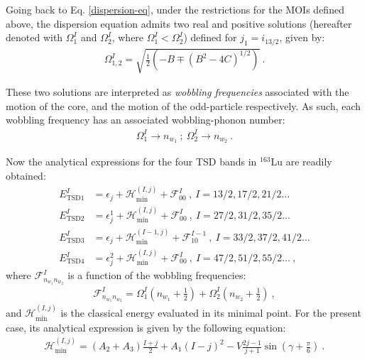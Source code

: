 \documentclass[myclassdoc,debug]{rjparticle}
\begin{document}
Going back to Eq. \ref{dispersion-eq}, under the restrictions for the MOIs defined above, the dispersion equation admits two real and positive solutions (hereafter denoted with $\Omega_1^I$ and $\Omega_2^I$, where $\Omega_1^I<\Omega_2^I$) defined for $j_1=i_{13/2}$, given by:
\begin{align}
    \Omega_{1,2}^I=\sqrt{\frac{1}{2}\left(-B\mp(B^2-4C)^{1/2}\right)}\ .
    \label{wobbling-frequencies}
\end{align}

These two solutions are interpreted as \emph{wobbling frequencies} associated with the motion of the core, and the motion of the odd-particle respectively. As such, each wobbling frequency has an associated wobbling-phonon number:
\begin{align}
    \Omega_1^I \to n_{w_1}\ ;\ \Omega_2^I \to n_{w_2}\ .
\end{align}


Now  the analytical expressions for the four TSD bands in $^{163}$Lu are readily obtained:
\begin{align}
    E_\text{TSD1}^I&=\epsilon_j+\mathcal{H}_\text{min}^{(I,j)}+\mathcal{F}_{00}^I\ ,\ I=13/2,17/2,21/2\dots \nonumber \\
    E_\text{TSD2}^I&=\epsilon_j^1+\mathcal{H}_\text{min}^{(I,j)}+\mathcal{F}_{00}^I\ ,\ I=27/2,31/2,35/2\dots \nonumber \\
    E_\text{TSD3}^I&=\epsilon_j+\mathcal{H}_\text{min}^{(I-1,j)}+\mathcal{F}_{10}^{I-1}\ ,\ I=33/2,37/2,41/2\dots \nonumber \\
    E_\text{TSD4}^I&=\epsilon_j^2+\mathcal{H}_\text{min}^{(I,j)}+\mathcal{F}_{00}^I\ ,\ I=47/2,51/2,55/2\dots\ ,
    \label{wobbling_energies}
\end{align}
where $\mathcal{F}_{n_{w_1}n_{w_2}}^I$ is a function of the wobbling frequencies:
\begin{align}
    \mathcal{F}_{n_{w_1}n_{w_2}}^I=\Omega_1^I\left(n_{w_1}+\frac{1}{2}\right)+\Omega_2^I\left(n_{w_2}+\frac{1}{2}\right)\ ,
    \label{f-term}
\end{align}
and $\mathcal{H}_\text{min}^{(I,j)}$ is the classical energy evaluated in its minimal point. For the present case, its analytical expression is given by the following equation:
\begin{align}
\mathcal{H}_\text{min}^{(I,j)}=(A_2+A_3)\frac{I+j}{2}+A_1(I-j)^2-V\frac{2j-1}{j+1}\sin\left(\gamma+\frac{\pi}{6}\right)\ .
    \label{hmin:equation}
\end{align}
\end{document}
